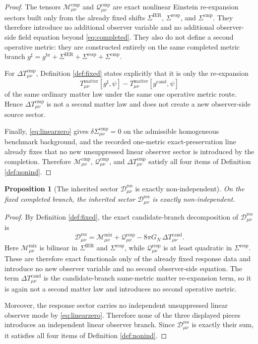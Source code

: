 \documentclass[11pt]{article}
\newcommand{\ObserverMetric}{g^{\mathrm{br}}}
\newcommand{\CandidateMetric}{g^{\mathrm{cand}}}
\newcommand{\CompletedMetric}{g^{\sharp}}
\newcommand{\BaseShift}{\Sigma^{\mathrm{IER}}}
\newcommand{\ResponseShift}{\Sigma^{\mathrm{resp}}}
\newcommand{\CompShift}{\Sigma^{\mathrm{cmp}}}
\newcommand{\ResidualDec}{\mathcal D_{\mu\nu}^{\mathrm{res}}}
\newcommand{\MixQuad}{\mathcal M_{\mu\nu}^{\mathrm{mix}}}
\newcommand{\RespQuad}{\mathcal Q_{\mu\nu}^{\mathrm{resp}}}
\newcommand{\DeltaTCand}{\Delta T_{\mu\nu}^{\mathrm{cand}}}
\newcommand{\CompMix}{\mathcal M_{\mu\nu}^{\mathrm{cmp}}}
\newcommand{\CompQuad}{\mathcal Q_{\mu\nu}^{\mathrm{cmp}}}
\newcommand{\DeltaTComp}{\Delta T_{\mu\nu}^{\mathrm{cmp}}}
\newtheorem{proposition}{Proposition}
\begin{document}
\begin{proof}
The tensors \(\CompMix\) and \(\CompQuad\) are exact nonlinear Einstein re-expansion sectors built only from the already fixed shifts \(\BaseShift\), \(\ResponseShift\), and \(\CompShift\). They therefore introduce no additional observer variable and no additional observer-side field equation beyond \eqref{eq:completed}. They also do not define a second operative metric: they are constructed entirely on the same completed metric branch \(\CompletedMetric=\ObserverMetric+\BaseShift+\ResponseShift+\CompShift\).

For \(\DeltaTComp\), Definition \ref{def:fixed} states explicitly that it is only the re-expansion
\[
T_{\mu\nu}^{\mathrm{matter}}[\CompletedMetric,\psi]
-
T_{\mu\nu}^{\mathrm{matter}}[\CandidateMetric,\psi]
\]
of the same ordinary matter law under the same one operative metric route. Hence \(\DeltaTComp\) is not a second matter law and does not create a new observer-side source sector.

Finally, \eqref{eq:linearzero} gives \(\delta\CompShift_{\mu\nu}=0\) on the admissible homogeneous benchmark background, and the recorded one-metric exact-preservation line already fixes that no new unsuppressed linear observer sector is introduced by the completion. Therefore \(\CompMix\), \(\CompQuad\), and \(\DeltaTComp\) satisfy all four items of Definition \ref{def:nonind}.
\end{proof}

\begin{proposition}[The inherited sector \texorpdfstring{\(\ResidualDec\)}{ResidualDec} is exactly non-independent]
\label{prop:resdec}
On the fixed completed branch, the inherited sector \(\ResidualDec\) is exactly non-independent.
\end{proposition}

\begin{proof}
By Definition \ref{def:fixed}, the exact candidate-branch decomposition of \(\ResidualDec\) is
\[
\ResidualDec
=
\MixQuad+\RespQuad-8\pi G_N\,\DeltaTCand.
\]
Here \(\MixQuad\) is bilinear in \(\BaseShift\) and \(\ResponseShift\), while \(\RespQuad\) is at least quadratic in \(\ResponseShift\). These are therefore exact functionals only of the already fixed response data and introduce no new observer variable and no second observer-side equation. The term \(\DeltaTCand\) is the candidate-branch same-metric matter re-expansion term, so it is again not a second matter law and introduces no second operative metric.

Moreover, the response sector carries no independent unsuppressed linear observer mode by \eqref{eq:linearzero}. Therefore none of the three displayed pieces introduces an independent linear observer branch. Since \(\ResidualDec\) is exactly their sum, it satisfies all four items of Definition \ref{def:nonind}.
\end{proof}
\end{document}

